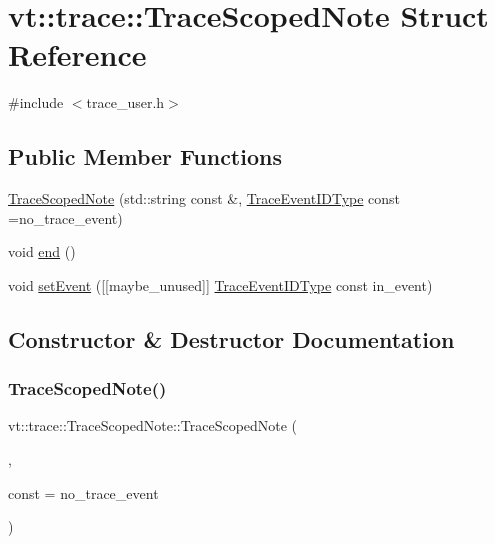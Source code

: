 \hypertarget{structvt_1_1trace_1_1_trace_scoped_note}{}\section{vt\+:\+:trace\+:\+:Trace\+Scoped\+Note Struct Reference}
\label{structvt_1_1trace_1_1_trace_scoped_note}


{\ttfamily \#include $<$trace\+\_\+user.\+h$>$}

\subsection*{Public Member Functions}
\begin{DoxyCompactItemize}
\item 
\hyperlink{structvt_1_1trace_1_1_trace_scoped_note_ab7dda5555f9118355f6cc77f7b3cdec8}{Trace\+Scoped\+Note} (std\+::string const \&, \hyperlink{namespacevt_1_1trace_a64a7185f3e102df8d8258f263ccd1582}{Trace\+Event\+I\+D\+Type} const =no\+\_\+trace\+\_\+event)
\item 
void \hyperlink{structvt_1_1trace_1_1_trace_scoped_note_abfffe38b863ed36f508a3aecef7c094b}{end} ()
\item 
void \hyperlink{structvt_1_1trace_1_1_trace_scoped_note_acc768c8b812ee315650585887c4893f4}{set\+Event} (\mbox{[}\mbox{[}maybe\+\_\+unused\mbox{]}\mbox{]} \hyperlink{namespacevt_1_1trace_a64a7185f3e102df8d8258f263ccd1582}{Trace\+Event\+I\+D\+Type} const in\+\_\+event)
\end{DoxyCompactItemize}


\subsection{Constructor \& Destructor Documentation}
\mbox{\label{structvt_1_1trace_1_1_trace_scoped_note_ab7dda5555f9118355f6cc77f7b3cdec8}} 
\subsubsection{\texorpdfstring{Trace\+Scoped\+Note()}{TraceScopedNote()}}
{\footnotesize\ttfamily vt\+::trace\+::\+Trace\+Scoped\+Note\+::\+Trace\+Scoped\+Note (\begin{DoxyParamCaption}\item[{std\+::string const \&}]{,  }\item[{\hyperlink{namespacevt_1_1trace_a64a7185f3e102df8d8258f263ccd1582}{Trace\+Event\+I\+D\+Type}}]{const = {\ttfamily no\+\_\+trace\+\_\+event} }\end{DoxyParamCaption})\hspace{0.3cm}{\ttfamily [inline]}}



